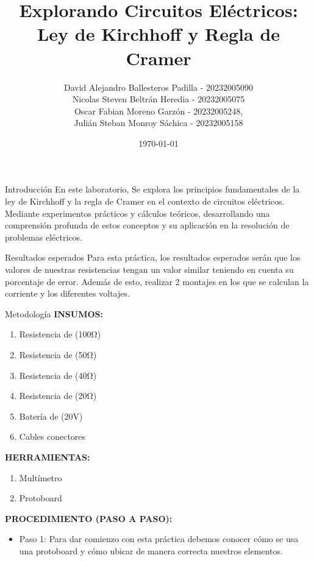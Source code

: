 \documentclass[svgnames, aspectratio=169]{beamer}
\title{Explorando Circuitos Eléctricos: Ley de Kirchhoff y Regla de Cramer}
\institute{Universidad Distrital Francisco José de Caldas\\ Ingeniería electrónica}
\author{David Alejandro Ballesteros Padilla - 20232005090\\
Nicolas Steven Beltrán Heredia - 20232005075\\
Oscar Fabian Moreno Garzón - 20232005248,\\
Julián Steban Monroy Sáchica - 20232005158}
\date{\today}
\begin{document}
\begin{frame}
  \titlepage
\end{frame}

\begin{frame}{Introducción}
  En este laboratorio, Se explora los principios fundamentales de la ley de Kirchhoff y la regla de Cramer en el contexto de circuitos eléctricos. Mediante experimentos prácticos y cálculos teóricos, desarrollando una comprensión profunda de estos conceptos y su aplicación en la resolución de problemas eléctricos.
\end{frame}

\begin{frame}{Resultados esperados}
  Para esta práctica, los resultados esperados serán que los valores de nuestras resistencias tengan un valor similar teniendo en cuenta su porcentaje de error. Además de esto, realizar 2 montajes en los que se calculan la corriente y los diferentes voltajes. 
\end{frame}

\begin{frame}{Metodología}
\textbf{INSUMOS:}
\begin{enumerate}
    \item Resistencia de (100Ω) 
    \item Resistencia de (50Ω) 
    \item Resistencia de (40Ω) 
    \item Resistencia de (20Ω) 
    \item Batería de (20V) 
    \item Cables conectores  
\end{enumerate}

\textbf{HERRAMIENTAS:}
\begin{enumerate}
    \item Multímetro 
    \item Protoboard 
\end{enumerate}

\textbf{PROCEDIMIENTO (PASO A PASO):}
\begin{itemize}
      \item Paso 1: Para dar comienzo con esta práctica debemos conocer cómo se usa una protoboard y cómo ubicar de manera correcta nuestros elementos.
\end{itemize}
  
\end{frame}
\end{document}
